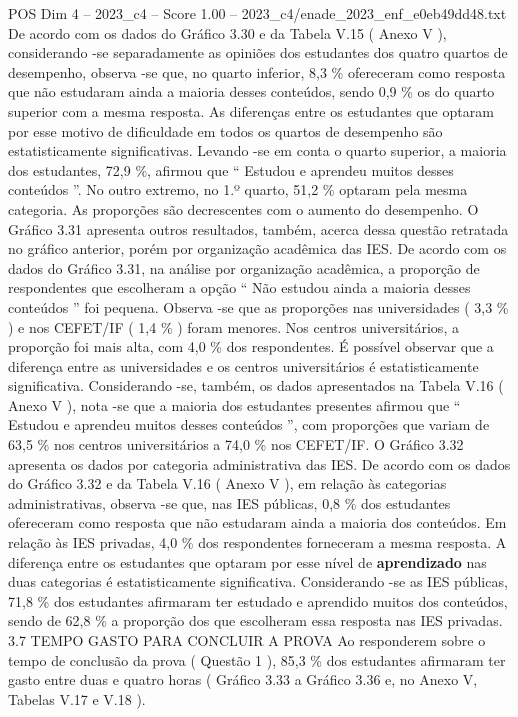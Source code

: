 \begin{textsample}{POS Dim 4 – 2023\_c4 – Score 1.00 – 2023\_c4/enade\_2023\_enf\_e0eb49dd48.txt}
De acordo com os dados do Gráfico 3.30 e da Tabela V.15 ( Anexo V ), considerando -se separadamente as opiniões dos estudantes dos quatro quartos de desempenho, observa -se que, no quarto inferior, 8,3 \% ofereceram como resposta que não estudaram ainda a maioria desses conteúdos, sendo 0,9 \% os do quarto superior com a mesma resposta.
As diferenças entre os estudantes que optaram por esse motivo de dificuldade em todos os quartos de desempenho são estatisticamente significativas.
Levando -se em conta o quarto superior, a maioria dos estudantes, 72,9 \%, afirmou que “ Estudou e aprendeu muitos desses conteúdos ”.
No outro extremo, no 1.º quarto, 51,2 \% optaram pela mesma categoria.
As proporções são decrescentes com o aumento do desempenho.
O Gráfico 3.31 apresenta outros resultados, também, acerca dessa questão retratada no gráfico anterior, porém por organização acadêmica das IES.
De acordo com os dados do Gráfico 3.31, na análise por organização acadêmica, a proporção de respondentes que escolheram a opção “ Não estudou ainda a maioria desses conteúdos ” foi pequena.
Observa -se que as proporções nas universidades ( 3,3 \% ) e nos CEFET/IF ( 1,4 \% ) foram menores.
Nos centros universitários, a proporção foi mais alta, com 4,0 \% dos respondentes.
É possível observar que a diferença entre as universidades e os centros universitários é estatisticamente significativa.
Considerando -se, também, os dados apresentados na Tabela V.16 ( Anexo V ), nota -se que a maioria dos estudantes presentes afirmou que “ Estudou e aprendeu muitos desses conteúdos ”, com proporções que variam de 63,5 \% nos centros universitários a 74,0 \% nos CEFET/IF.
O Gráfico 3.32 apresenta os dados por categoria administrativa das IES.
De acordo com os dados do Gráfico 3.32 e da Tabela V.16 ( Anexo V ), em relação às categorias administrativas, observa -se que, nas IES públicas, 0,8 \% dos estudantes ofereceram como resposta que não estudaram ainda a maioria dos conteúdos.
Em relação às IES privadas, 4,0 \% dos respondentes forneceram a mesma resposta.
A diferença entre os estudantes que optaram por esse nível de \textbf{aprendizado} nas duas categorias é estatisticamente significativa.
Considerando -se as IES públicas, 71,8 \% dos estudantes afirmaram ter estudado e aprendido muitos dos conteúdos, sendo de 62,8 \% a proporção dos que escolheram essa resposta nas IES privadas. 3.7 TEMPO GASTO PARA CONCLUIR A PROVA Ao responderem sobre o tempo de conclusão da prova ( Questão 1 ), 85,3 \% dos estudantes afirmaram ter gasto entre duas e quatro horas ( Gráfico 3.33 a Gráfico 3.36 e, no Anexo V, Tabelas V.17 e V.18 ).

\end{textsample}
